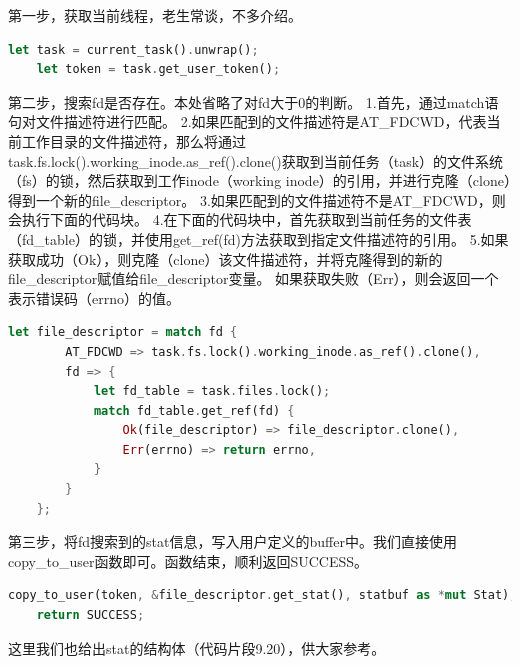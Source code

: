 第一步，获取当前线程，老生常谈，不多介绍。
\begin{lstlisting}[language={Rust}, 
	caption={获取线程}]
    let task = current_task().unwrap();
    let token = task.get_user_token();
\end{lstlisting}
第二步，搜索fd是否存在。本处省略了对fd大于0的判断。
1.首先，通过match语句对文件描述符进行匹配。
2.如果匹配到的文件描述符是AT_FDCWD，代表当前工作目录的文件描述符，那么将通过task.fs.lock().working_inode.as_ref().clone()获取到当前任务（task）的文件系统（fs）的锁，然后获取到工作inode（working inode）的引用，并进行克隆（clone）得到一个新的file_descriptor。
3.如果匹配到的文件描述符不是AT_FDCWD，则会执行下面的代码块。
4.在下面的代码块中，首先获取到当前任务的文件表（fd_table）的锁，并使用get_ref(fd)方法获取到指定文件描述符的引用。
5.如果获取成功（Ok），则克隆（clone）该文件描述符，并将克隆得到的新的file_descriptor赋值给file_descriptor变量。
如果获取失败（Err），则会返回一个表示错误码（errno）的值。
\begin{lstlisting}[language={Rust}, 
	caption={fd查找}]
    let file_descriptor = match fd {
        AT_FDCWD => task.fs.lock().working_inode.as_ref().clone(),
        fd => {
            let fd_table = task.files.lock();
            match fd_table.get_ref(fd) {
                Ok(file_descriptor) => file_descriptor.clone(),
                Err(errno) => return errno,
            }
        }
    };
\end{lstlisting}
第三步，将fd搜索到的stat信息，写入用户定义的buffer中。我们直接使用copy_to_user函数即可。函数结束，顺利返回SUCCESS。
\begin{lstlisting}[language={Rust}, 
	caption={赋值stat buffer}]
    copy_to_user(token, &file_descriptor.get_stat(), statbuf as *mut Stat);
    return SUCCESS;
\end{lstlisting}
这里我们也给出stat的结构体（代码片段9.20），供大家参考。